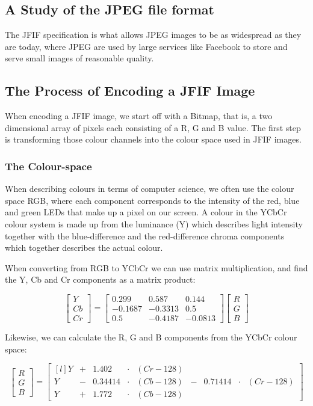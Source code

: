 \begin{infobox}{\section[A Study of the JPEG file format]{A Study of the JPEG file format}}
The JFIF specification is what allows JPEG images to be as widespread as they are today, where JPEG are used by large services like Facebook to store and serve small images of reasonable quality.


\subsection*{The Process of Encoding a JFIF Image}
When encoding a JFIF image, we start off with a Bitmap, that is, a two dimensional array of pixels each consisting of a R, G and B value. The first step is transforming those colour channels into the colour space used in JFIF images. 

\subsubsection*{The Colour-space}
When describing colours in terms of computer science, we often use the colour space RGB, where each component corresponds to the intensity of the red, blue and green LEDs that make up a pixel on our screen. A colour in the YCbCr colour system is made up from the luminance (Y) which describes light intensity together with the blue-difference and the red-difference chroma components which together describes the actual colour.

When converting from RGB to YCbCr we can use matrix multiplication, and find the Y, Cb and Cr components as a matrix product:

$$\begin{bmatrix}
	Y\\Cb\\Cr
\end{bmatrix} = \begin{bmatrix}
	0.299 & 0.587 & 0.144\\
	-0.1687 & -0.3313 & 0.5\\
	0.5 & -0.4187 & -0.0813
\end{bmatrix}\begin{bmatrix}
	R\\G\\B
\end{bmatrix}$$

Likewise, we can calculate the R, G and B components from the YCbCr colour space:

$$\begin{bmatrix}
	R\\G\\B
\end{bmatrix} = \begin{bmatrix*}[l]
	Y&+&1.402 &\cdot & (Cr-128)&\\
	Y &-& 0.34414&\cdot &(Cb-128) &- &0.71414&\cdot&(Cr-128)\\
	Y &+& 1.772&\cdot& (Cb-128)&
\end{bmatrix*}$$


\end{infobox}
